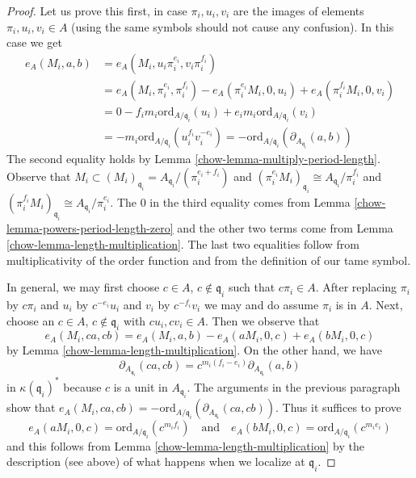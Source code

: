 \begin{proof}
\medskip\noindent
Let us prove this first, in case $\pi_i, u_i, v_i$ are the images
of elements $\pi_i, u_i, v_i \in A$ (using the same symbols
should not cause any confusion). In this case we get
\begin{align*}
e_A(M_i, a, b) & =
e_A(M_i, u_i\pi_i^{e_i}, v_i\pi_i^{f_i}) \\
& =
e_A(M_i, \pi_i^{e_i}, \pi_i^{f_i}) -
e_A(\pi_i^{e_i}M_i, 0, u_i) +
e_A(\pi_i^{f_i}M_i, 0, v_i) \\
& =
0 -
f_im_i\text{ord}_{A/\mathfrak q_i}(u_i) +
e_im_i\text{ord}_{A/\mathfrak q_i}(v_i) \\
& =
-m_i\text{ord}_{A/\mathfrak q_i}(u_i^{f_i}v_i^{-e_i}) =
-\text{ord}_{A/\mathfrak q_i}(\partial_{A_{\mathfrak q_i}}(a, b))
\end{align*}
The second equality holds by Lemma \ref{chow-lemma-multiply-period-length}.
Observe that
$M_i \subset (M_i)_{\mathfrak q_i} = A_{\mathfrak q_i}/(\pi_i^{e_i + f_i})$
and
$(\pi_i^{e_i}M_i)_{\mathfrak q_i} \cong A_{\mathfrak q_i}/\pi_i^{f_i}$ and
$(\pi_i^{f_i}M_i)_{\mathfrak q_i} \cong A_{\mathfrak q_i}/\pi_i^{e_i}$.
The $0$ in the third equality comes from
Lemma \ref{chow-lemma-powers-period-length-zero}
and the other two terms come from
Lemma \ref{chow-lemma-length-multiplication}.
The last two equalities follow from multiplicativity of
the order function and from the definition of our tame symbol.

\medskip\noindent
In general, we may first choose $c \in A$, $c \not \in \mathfrak q_i$
such that $c\pi_i \in A$. After replacing $\pi_i$ by $c\pi_i$
and $u_i$ by $c^{-e_i}u_i$ and $v_i$ by $c^{-f_i}v_i$
we may and do assume $\pi_i$ is in $A$.
Next, choose an $c \in A$, $c \not \in \mathfrak q_i$
with $cu_i, cv_i \in A$. Then we observe that
$$
e_A(M_i, ca, cb) = e_A(M_i, a, b) - e_A(aM_i, 0, c) + e_A(bM_i, 0, c)
$$
by Lemma \ref{chow-lemma-length-multiplication}.
On the other hand, we have
$$
\partial_{A_{\mathfrak q_i}}(ca, cb) =
c^{m_i(f_i - e_i)}\partial_{A_{\mathfrak q_i}}(a, b)
$$
in $\kappa(\mathfrak q_i)^*$ because $c$ is a unit in $A_{\mathfrak q_i}$.
The arguments in the previous paragraph show that
$e_A(M_i, ca, cb) = -
\text{ord}_{A/\mathfrak q_i}(\partial_{A_{\mathfrak q_i}}(ca, cb))$.
Thus it suffices to prove
$$
e_A(aM_i, 0, c) = \text{ord}_{A/\mathfrak q_i}(c^{m_if_i})
\quad\text{and}\quad
e_A(bM_i, 0, c) = \text{ord}_{A/\mathfrak q_i}(c^{m_ie_i})
$$
and this follows from Lemma \ref{chow-lemma-length-multiplication}
by the description (see above)
of what happens when we localize at $\mathfrak q_i$.
\end{proof}

